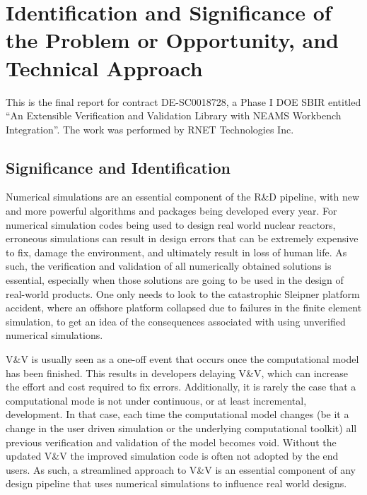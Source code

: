 \section{Identification and Significance of the Problem or Opportunity, and Technical Approach}

This is the final report for contract DE-SC0018728, a Phase I DOE SBIR
entitled ``An Extensible Verification and Validation Library with NEAMS Workbench Integration''. The work was performed by RNET Technologies 
Inc. 

\subsection{Significance and Identification}
\label{intro} 
Numerical simulations are an essential component of the R\&D pipeline, with new and more powerful algorithms and packages being developed every year. For numerical simulation codes being used to design real world nuclear reactors, erroneous simulations can result in design errors that can be extremely expensive to fix, damage the environment, and ultimately result in loss of human life. As such, the verification and validation of all numerically obtained solutions is essential, especially when those solutions are going to be used in the design of real-world products. One only needs to look to the catastrophic Sleipner platform accident, where an offshore platform collapsed due to failures in the finite element simulation, to get an idea of the consequences associated with using unverified numerical simulations. 

V\&V is usually seen as a one-off event that occurs once the computational model has been finished. This results in developers delaying V\&V, which can increase the effort and cost required to fix errors. Additionally, it is rarely the case that a computational mode is not under continuous, or at least incremental, development. In that case, each time the computational model changes (be it  a change in the user driven simulation or the underlying computational toolkit) all previous verification and validation of the model becomes void. Without the updated V\&V the improved simulation code is often not adopted by the end users. As such, a streamlined approach to V\&V is an essential component of any design pipeline that uses numerical simulations to influence real world designs.

